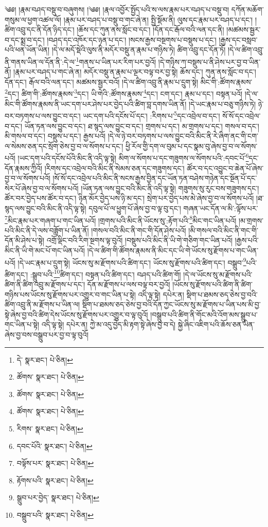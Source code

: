 \setcounter{footnote}{0} 
༄༅། །རྣམ་བཤད་བསྡུ་བ་བཞུགས། །༄༅། །རྣལ་འབྱོར་སྤྱོད་པའི་ས་ལས་རྣམ་པར་བཤད་པ་བསྡུ་བ། དཀོན་མཆོག་གསུམ་ལ་ཕྱག་འཚལ་ལོ། །རྣམ་པར་བཤད་པ་བསྡུ་བ་གང་ཞེ་ན། སྤྱི་སྡོམ་ནི། ལུས་དང་རྣམ་པར་བཤད་པ་དང་། །ཚིག་འབྲུ་དང་ནི་དོན་ཉིད་དང་། །ཆོས་དང་ཀུན་ནས་སློང་བ་དང་། །དོན་དང་རྒོལ་བའི་ལན་དང་ནི། །མཚམས་སྦྱར་བ་དང་སྨྲ་བ་དང་། །བཤད་དང་འཁོར་དང་ཉན་པ་དང་། །སངས་རྒྱས་བསྔགས་པ་བསྡུས་པ་དང་། །རྒྱས་དང་བསླབ་པའི་ཕན་ཡོན་ཡིན། །དེ་ལ་མདོ་སྡེའི་ལུས་ནི་མདོར་བསྡུ་ན་རྣམ་པ་གཉིས་ཏེ། ཚིག་འབྲུ་དང་དོན་ཏོ། །དེ་ལ་ཚིག་འབྲུ་ནི་གནས་ཡིན་ལ་དོན་ནི་:དེ་ལ་\footnote{དེ་  སྣར་ཐང་།  པེ་ཅིན། }གནས་པ་ཡིན་པར་རིག་པར་བྱའོ། །དེ་གཉིས་ཀ་བསྡུས་པ་ནི་ཤེས་པར་བྱ་བ་ཡིན་ནོ། །རྣམ་པར་བཤད་པ་གང་ཞེ་ན། མདོར་བསྡུ་ན་རྣམ་པ་ལྔར་བལྟ་བར་བྱ་སྟེ། ཆོས་དང་། ཀུན་ནས་སློང་བ་དང་། དོན་དང་། རྒོལ་བའི་ལན་དང་། མཚམས་སྦྱར་བའོ། །དེ་ལ་ཚིག་འབྲུ་ནི་རྣམ་པ་དྲུག་སྟེ། མིང་གི་:ཚོགས་རྣམས་\footnote{ཚོགས་  སྣར་ཐང་།  པེ་ཅིན། }དང་། ཚིག་གི་:ཚོགས་རྣམས་\footnote{ཚོགས་  སྣར་ཐང་།  པེ་ཅིན། }དང་། ཡི་གེའི་:ཚོགས་རྣམས་\footnote{ཚོགས་  སྣར་ཐང་།  པེ་ཅིན། }དང་། ངག་དང་། རྣམ་པ་དང་། བསྟན་པའོ། །དེ་ལ་མིང་གི་ཚོགས་རྣམས་ནི་ཡང་དག་པར་ཤེས་པར་བྱེད་པའི་ཚིག་བླ་དགས་ཡིན་ནོ། །དེ་ཡང་རྣམ་པ་བཅུ་གཉིས་ཏེ། ཉེ་བར་བཏགས་པ་ལས་བྱུང་བ་དང་། ཡང་དག་པའི་དངོས་པོ་དང་། :རིགས་པ་\footnote{རིགས་  སྣར་ཐང་།  པེ་ཅིན། }དང་འབྲེལ་བ་དང་། སོ་སོ་དང་འབྲེལ་བ་དང་། ཡོན་ཏན་ལས་བྱུང་བ་དང་། ཐ་སྙད་ལས་བྱུང་བ་དང་། གྲགས་པ་དང་། མ་གྲགས་པ་དང་། གསལ་བ་དང་། མི་གསལ་བ་དང་། བསྡུས་པ་དང་། རྒྱས་པའོ། །དེ་ལ་ཉེ་བར་བཏགས་པ་ལས་བྱུང་བའི་མིང་ནི་རེ་ཞིག་ནང་གི་ངག་ལ་སེམས་ཅན་དང་སྲོག་ཅེས་བྱ་བ་ལ་སོགས་པ་དང་། ཕྱི་རོལ་གྱི་དག་ལ་བུམ་པ་དང་སྣམ་བུ་ཞེས་བྱ་བ་ལ་སོགས་པའོ། །ཡང་དག་པའི་དངོས་པོའི་མིང་ནི་འདི་ལྟ་སྟེ། མིག་ལ་སོགས་པ་དང་གཟུགས་ལ་སོགས་པའི་:དབང་པོ་\footnote{དབང་པོའི་  སྣར་ཐང་།  པེ་ཅིན། }དང་དོན་རྣམས་ཀྱིའོ། །རིགས་དང་འབྲེལ་བའི་མིང་ནི་སེམས་ཅན་དང་གཟུགས་དང་། ཚོར་བ་དང་འབྱུང་བ་ཆེན་པོ་ཞེས་བྱ་བ་ལ་སོགས་པའོ། །སོ་སོ་དང་འབྲེལ་པའི་མིང་ནི་སངས་རྒྱས་བྱིན་དང་ཡོན་ཏན་བཤེས་གཉེན་དང་སྔོན་པོ་དང་སེར་པོ་ཞེས་བྱ་བ་ལ་སོགས་པའོ། །ཡོན་ཏན་ལས་བྱུང་བའི་མིང་ནི་འདི་ལྟ་སྟེ། གཟུགས་སུ་རུང་བས་གཟུགས་དང་། ཚོར་བར་བྱེད་པས་ཚོར་བ་དང་། ཉིན་མོར་བྱེད་པས་ཉི་མ་དང་། སྲེག་པར་བྱེད་པས་མེ་ཞེས་བྱ་བ་ལ་སོགས་པའོ། །ཐ་སྙད་ལས་བྱུང་བའི་མིང་ནི་འདི་ལྟ་སྟེ། དབུལ་པོ་ལ་ཕྱུག་པོ་ཞེས་བྱ་བ་ལྟ་བུ་དང་། གཞན་ཡང་དོན་ལ་མི་:ལྟོས་པར་\footnote{བལྟོས་པར་  སྣར་ཐང་།  པེ་ཅིན། }མིང་རྣམ་པར་གཞག་པ་གང་ཡིན་པའོ། །གྲགས་པའི་མིང་ནི་ཡོངས་སུ་:རྟོག་པའི་\footnote{རྟོགས་པའི་  སྣར་ཐང་།  པེ་ཅིན། }མིང་གང་ཡིན་པའོ། །མ་གྲགས་པའི་མིང་ནི་དེ་ལས་བཟློག་པ་ཡིན་ནོ། །གསལ་བའི་མིང་ནི་གང་གི་དོན་ཤེས་པའོ། །མི་གསལ་བའི་མིང་ནི་གང་གི་དོན་མི་ཤེས་པ་སྟེ། འགྲོ་ལྡིང་བའི་རིག་སྔགས་ལྟ་བུའོ། །བསྡུས་པའི་མིང་ནི་ཡི་གེ་གཅིག་གང་ཡིན་པའོ། །རྒྱས་པའི་མིང་ནི་ཡི་གེ་མང་པོ་གང་ཡིན་པའོ། །དེ་ལ་ཚིག་གི་ཚོགས་རྣམས་ནི་མིང་དང་ཡི་གེ་ཡོངས་སུ་རྫོགས་པ་གང་ཡིན་པའོ། །དེ་ཡང་རྣམ་པ་དྲུག་སྟེ། ཡོངས་སུ་མ་རྫོགས་པའི་ཚིག་དང་། ཡོངས་སུ་རྫོགས་པའི་ཚིག་དང་། བསྒྲུབ་\footnote{སྒྲུབ་པར་བྱེད་  སྣར་ཐང་།  པེ་ཅིན། }པའི་ཚིག་དང་། :སྒྲུབ་པའི་\footnote{བསྒྲུབ་པའི་  སྣར་ཐང་།  པེ་ཅིན། }ཚིག་དང་། བསྟན་པའི་ཚིག་དང་། བཤད་པའི་ཚིག་གོ། །དེ་ལ་ཡོངས་སུ་མ་རྫོགས་པའི་ཚིག་ནི་ཚིག་འབྲུ་མ་རྫོགས་པ་དང་། དོན་མ་རྫོགས་པ་ལས་བལྟ་བར་བྱའོ། །ཡོངས་སུ་རྫོགས་པའི་ཚིག་ནི་ཚིག་གཉིས་པས་ཡོངས་སུ་རྫོགས་པར་འགྱུར་བ་གང་ཡིན་པ་སྟེ། འདི་ལྟ་སྟེ། དཔེར་ན། སྡིག་པ་ཐམས་ཅད་ཅེས་བྱ་བའི་ཚིག་འབྲུ་ནི་མ་རྫོགས་པ་ཡིན་ལ། སྡིག་པ་ཐམས་ཅད་ཅེས་བྱ་བའི་དོན་ཀྱང་ཡོངས་སུ་མ་རྫོགས་པ་ཡིན་པས་མི་བྱ་སྟེ་ཞེས་བྱ་བའི་ཚིག་དེས་ཡོངས་སུ་རྫོགས་པར་འགྱུར་བ་ལྟ་བུའོ། །བསྒྲུབ་པའི་ཚིག་ནི་གོང་མའི་འོག་མས་སྒྲུབ་པ་གང་ཡིན་པ་སྟེ། འདི་ལྟ་སྟེ། དཔེར་ན། ཀྱེ་མ་འདུ་བྱེད་མི་རྟག་སྟེ་ཞེས་བྱ་བ་དེ། སྐྱེ་ཞིང་འཇིག་པའི་ཆོས་ཅན་ཡིན་ཞེས་བྱ་བས་བསྒྲུབ་པར་བྱ་བ་ལྟ་བུའོ། 